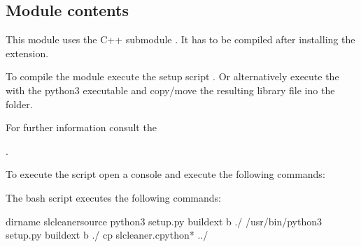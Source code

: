 \documentclass[a4paper,10pt,english]{sphinxmanual}
\begin{document}
\subsection{Module contents}
\label{\detokenize{drc:module-drc}}\label{\detokenize{drc:module-contents}}
This module uses the C++ submodule {\hyperref[\detokenize{drc:slcleaner}]{}}. It has to be compiled after installing the
extension.

To compile the module execute the setup script .
Or alternatively execute the  with the python3 executable
and copy/move the resulting  library file ino the  folder.

For further information consult the %
\begin{footnote}[4]\sphinxAtStartFootnote
{}
%
\end{footnote}.

To execute the script open a console and execute the following commands:

%
\begin{sphinxVerbatim}[commandchars=\\\{\}]
\end{sphinxVerbatim}

The bash script executes the following commands:

%
\begin{sphinxVerbatim}[commandchars=\\\{\}]

 dirname 
 slcleaner\PYGZus{}source
python3 setup.py build\PYGZus{}ext \PYGZhy{}b ./
/usr/bin/python3 setup.py build\PYGZus{}ext \PYGZhy{}b ./
cp slcleaner.cpython* ../
\end{sphinxVerbatim}
\end{document}
